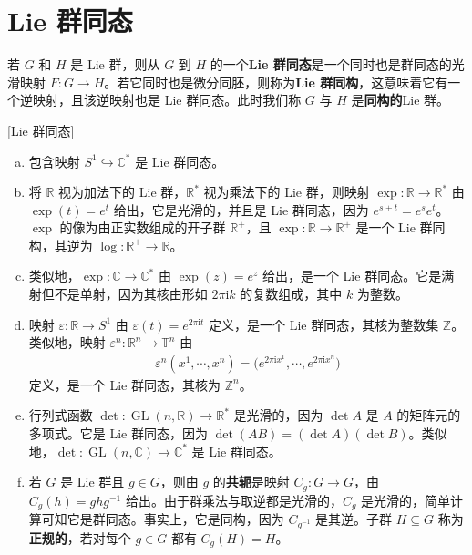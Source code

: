 \documentclass[../../main.tex]{subfiles}
\begin{document}
\section{Lie 群同态}\label{section:ch07-Lie群同态}

若 $G$ 和 $H$ 是 Lie 群，则从 $G$ 到 $H$ 的一个\textbf{Lie 群同态}是一个同时也是群同态的光滑映射 $F\colon G\to H$。若它同时也是微分同胚，则称为\textbf{Lie 群同构}，这意味着它有一个逆映射，且该逆映射也是 Lie 群同态。此时我们称 $G$ 与 $H$ 是\textbf{同构的}Lie 群。

\begin{example}\label{example:ch07-04}[Lie 群同态]
\begin{enumerate}[(a)]
\item 包含映射 $S^1\hookrightarrow\mathbb{C}^*$ 是 Lie 群同态。

\item 将 $\mathbb{R}$ 视为加法下的 Lie 群，$\mathbb{R}^*$ 视为乘法下的 Lie 群，则映射 $\exp\colon\mathbb{R}\to\mathbb{R}^*$ 由 $\exp(t)=e^t$ 给出，它是光滑的，并且是 Lie 群同态，因为 $e^{s+t}=e^s e^t$。$\exp$ 的像为由正实数组成的开子群 $\mathbb{R}^+$，且 $\exp\colon\mathbb{R}\to\mathbb{R}^+$ 是一个 Lie 群同构，其逆为 $\log\colon\mathbb{R}^+\to\mathbb{R}$。

\item 类似地，$\exp\colon\mathbb{C}\to\mathbb{C}^*$ 由 $\exp(z)=e^z$ 给出，是一个 Lie 群同态。它是满射但不是单射，因为其核由形如 $2\pi\mathrm{i}k$ 的复数组成，其中 $k$ 为整数。

\item 映射 $\varepsilon\colon\mathbb{R}\to S^1$ 由 $\varepsilon(t)=e^{2\pi\mathrm{i}t}$ 定义，是一个 Lie 群同态，其核为整数集 $\mathbb{Z}$。类似地，映射 $\varepsilon^n\colon\mathbb{R}^n\to\mathbb{T}^n$ 由
\begin{align*}
\varepsilon^n(x^1,\cdots ,x^n)=\bigl(e^{2\pi\mathrm{i}x^1},\cdots ,e^{2\pi\mathrm{i}x^n}\bigr)
\end{align*}
定义，是一个 Lie 群同态，其核为 $\mathbb{Z}^n$。

\item 行列式函数 $\det\colon\operatorname{GL}(n,\mathbb{R})\to\mathbb{R}^*$ 是光滑的，因为 $\det A$ 是 $A$ 的矩阵元的多项式。它是 Lie 群同态，因为 $\det(AB)=(\det A)(\det B)$。类似地，$\det\colon\operatorname{GL}(n,\mathbb{C})\to\mathbb{C}^*$ 是 Lie 群同态。

\item 若 $G$ 是 Lie 群且 $g\in G$，则由 $g$ 的\textbf{共轭}是映射 $C_g\colon G\to G$，由 $C_g(h)=ghg^{-1}$ 给出。由于群乘法与取逆都是光滑的，$C_g$ 是光滑的，简单计算可知它是群同态。事实上，它是同构，因为 $C_{g^{-1}}$ 是其逆。子群 $H\subseteq G$ 称为\textbf{正规的}，若对每个 $g\in G$ 都有 $C_g(H)=H$。
\end{enumerate}
\end{example}
\end{document}
